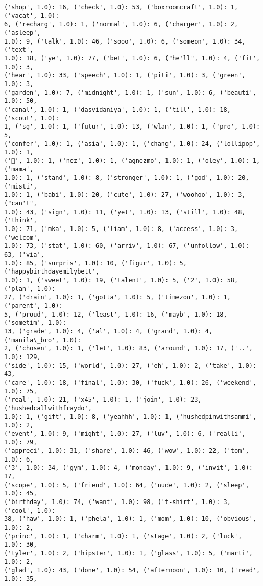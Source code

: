 \documentclass[11pt]{article}
\begin{document}
\begin{Verbatim}[commandchars=\\\{\}]
('shop', 1.0): 16, ('check', 1.0): 53, ('boxroomcraft', 1.0): 1, ('vacat', 1.0):
6, ('recharg', 1.0): 1, ('normal', 1.0): 6, ('charger', 1.0): 2, ('asleep',
1.0): 9, ('talk', 1.0): 46, ('sooo', 1.0): 6, ('someon', 1.0): 34, ('text',
1.0): 18, ('ye', 1.0): 77, ('bet', 1.0): 6, ("he'll", 1.0): 4, ('fit', 1.0): 3,
('hear', 1.0): 33, ('speech', 1.0): 1, ('piti', 1.0): 3, ('green', 1.0): 3,
('garden', 1.0): 7, ('midnight', 1.0): 1, ('sun', 1.0): 6, ('beauti', 1.0): 50,
('canal', 1.0): 1, ('dasvidaniya', 1.0): 1, ('till', 1.0): 18, ('scout', 1.0):
1, ('sg', 1.0): 1, ('futur', 1.0): 13, ('wlan', 1.0): 1, ('pro', 1.0): 5,
('confer', 1.0): 1, ('asia', 1.0): 1, ('chang', 1.0): 24, ('lollipop', 1.0): 1,
('🍭', 1.0): 1, ('nez', 1.0): 1, ('agnezmo', 1.0): 1, ('oley', 1.0): 1, ('mama',
1.0): 1, ('stand', 1.0): 8, ('stronger', 1.0): 1, ('god', 1.0): 20, ('misti',
1.0): 1, ('babi', 1.0): 20, ('cute', 1.0): 27, ('woohoo', 1.0): 3, ("can't",
1.0): 43, ('sign', 1.0): 11, ('yet', 1.0): 13, ('still', 1.0): 48, ('think',
1.0): 71, ('mka', 1.0): 5, ('liam', 1.0): 8, ('access', 1.0): 3, ('welcom',
1.0): 73, ('stat', 1.0): 60, ('arriv', 1.0): 67, ('unfollow', 1.0): 63, ('via',
1.0): 85, ('surpris', 1.0): 10, ('figur', 1.0): 5, ('happybirthdayemilybett',
1.0): 1, ('sweet', 1.0): 19, ('talent', 1.0): 5, ('2', 1.0): 58, ('plan', 1.0):
27, ('drain', 1.0): 1, ('gotta', 1.0): 5, ('timezon', 1.0): 1, ('parent', 1.0):
5, ('proud', 1.0): 12, ('least', 1.0): 16, ('mayb', 1.0): 18, ('sometim', 1.0):
13, ('grade', 1.0): 4, ('al', 1.0): 4, ('grand', 1.0): 4, ('manila\_bro', 1.0):
2, ('chosen', 1.0): 1, ('let', 1.0): 83, ('around', 1.0): 17, ('..', 1.0): 129,
('side', 1.0): 15, ('world', 1.0): 27, ('eh', 1.0): 2, ('take', 1.0): 43,
('care', 1.0): 18, ('final', 1.0): 30, ('fuck', 1.0): 26, ('weekend', 1.0): 75,
('real', 1.0): 21, ('x45', 1.0): 1, ('join', 1.0): 23, ('hushedcallwithfraydo',
1.0): 1, ('gift', 1.0): 8, ('yeahhh', 1.0): 1, ('hushedpinwithsammi', 1.0): 2,
('event', 1.0): 9, ('might', 1.0): 27, ('luv', 1.0): 6, ('realli', 1.0): 79,
('appreci', 1.0): 31, ('share', 1.0): 46, ('wow', 1.0): 22, ('tom', 1.0): 6,
('3', 1.0): 34, ('gym', 1.0): 4, ('monday', 1.0): 9, ('invit', 1.0): 17,
('scope', 1.0): 5, ('friend', 1.0): 64, ('nude', 1.0): 2, ('sleep', 1.0): 45,
('birthday', 1.0): 74, ('want', 1.0): 98, ('t-shirt', 1.0): 3, ('cool', 1.0):
38, ('haw', 1.0): 1, ('phela', 1.0): 1, ('mom', 1.0): 10, ('obvious', 1.0): 2,
('princ', 1.0): 1, ('charm', 1.0): 1, ('stage', 1.0): 2, ('luck', 1.0): 30,
('tyler', 1.0): 2, ('hipster', 1.0): 1, ('glass', 1.0): 5, ('marti', 1.0): 2,
('glad', 1.0): 43, ('done', 1.0): 54, ('afternoon', 1.0): 10, ('read', 1.0): 35,

\end{Verbatim}
\end{document}
